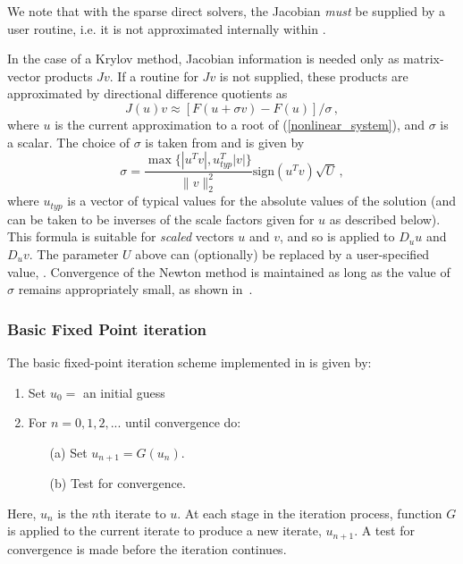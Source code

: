 We note that with the sparse direct solvers, the Jacobian {\em must}
be supplied by a user routine,
i.e. it is not approximated internally within {\kinsol}.

In the case of a Krylov method, Jacobian information is needed 
only as matrix-vector products $Jv$.  If a routine for $Jv$ is 
not supplied, these products are approximated by directional
difference quotients as
\begin{equation}\label{e:JvDQ}
J(u) v \approx [F(u+\sigma v) - F(u)]/\sigma \, ,
\end{equation}
where $u$ is the current approximation to a root of
(\ref{nonlinear_system}), and $\sigma$ is a scalar. The choice of
$\sigma$ is taken from \cite{BrSa:90} and is given by
\begin{equation}\label{e:sigmaDQ_iterative}
  \sigma = \frac{\max \{|u^T v|, u^T_{typ} |v|\}}{\|v\|_2^2}
  \mbox{sign}(u^T v) \sqrt{U} \, ,
\end{equation}
where $u_{typ}$ is a vector of typical values for the absolute
values of the solution (and can be taken to be inverses of the
scale factors given for $u$ as described below).
This formula is suitable for {\it scaled} vectors $u$ and $v$, and
so is applied to $D_u u$ and $D_u v$.
The parameter $U$ above can (optionally) be replaced by a
user-specified value, .
Convergence of the Newton method is maintained as long as the
value of $\sigma$ remains appropriately small, as shown in~\cite{Bro:87}.


\subsubsection*{Basic Fixed Point iteration}
The basic fixed-point iteration scheme implemented in {\kinsol} is given by:

\vspace{1ex}
\begin{enumerate}
   \item Set $u_0 = $ an initial guess
   \item For $n = 0, 1, 2,...$ until convergence do:
      \begin{itemize}
          \item[(a)] Set $u_{n+1} = G(u_n)$.
          \item[(b)] Test for convergence.
      \end{itemize}
\end{enumerate}
Here, $u_n$ is the $n$th iterate to $u$.
At each stage in the iteration process, function $G$ is applied to the current 
iterate to produce a new iterate, $u_{n+1}$.
A test for convergence is made before the iteration continues.


